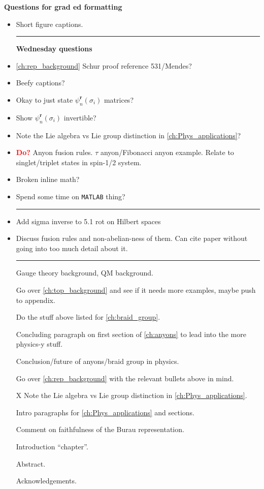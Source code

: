 \textbf{Questions for grad ed formatting}
\begin{itemize}
    \item Short figure captions.
    
    \begin{center}\rule{.85\textwidth}{0.65pt}\end{center}
    \textbf{Wednesday questions}
    \item \cref{ch:rep_background} Schur proof reference 531/Mendes?
    \item Beefy captions?
    \item Okay to just state $\psi_n^\textbf{r}(\sigma_i)$ matrices?
    \item Show $\psi_n^\textbf{r}(\sigma_i)$ invertible?
    \item Note the Lie algebra vs Lie group distinction in \cref{ch:Phys_applications}?
    \item \textbf{\textcolor{red}{Do?}} Anyon fusion rules. $\tau$ anyon/Fibonacci anyon example. Relate to singlet/triplet states in spin-1/2 system.
    \item Broken inline math?
    \item \textcolor{black!50!white}{Spend some time on \texttt{MATLAB} thing?}
    \begin{center}\rule{.85\textwidth}{0.65pt}\end{center}
    \item Add sigma inverse to 5.1 rot on Hilbert spaces
    \item Discuss fusion rules and non-abelian-ness of them. Can cite paper without going into too much detail about it.

    \begin{center}\rule{.85\textwidth}{0.65pt}\end{center}
    \item[\checkmark] Gauge theory background, QM background.
    \item[\checkmark] Go over \cref{ch:top_background} and see if it needs more examples, maybe push to appendix.
    \item[\checkmark] Do the stuff above listed for \cref{ch:braid_group}.
    \item[\checkmark] Concluding paragraph on first section of \cref{ch:anyons} to lead into the more physics-y stuff.
    \item[\checkmark] Conclusion/future of anyons/braid group in physics.
    \item[\checkmark] Go over \cref{ch:rep_background} with the relevant bullets above in mind.
    \item[X] Note the Lie algebra vs Lie group distinction in \cref{ch:Phys_applications}.
    \item[\checkmark] Intro paragraphs for \cref{ch:Phys_applications} and sections.
    \item[\checkmark] Comment on faithfulness of the Burau representation.
    \item[\checkmark] Introduction ``chapter''.
    \item[\checkmark] Abstract.
    \item[\checkmark] Acknowledgements.
\end{itemize}
